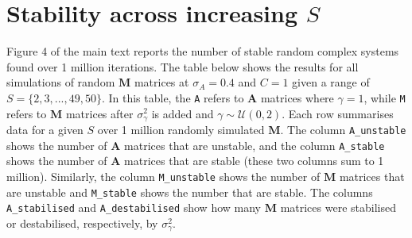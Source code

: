 \documentclass[]{article}
\begin{document}
\hypertarget{IncrS}{\section{\texorpdfstring{Stability across increasing
\(S\)}{Stability across increasing S}}\label{IncrS}}

Figure 4 of the main text reports the number of stable random complex
systems found over 1 million iterations. The table below shows the
results for all simulations of random \(\mathbf{M}\) matrices at
\(\sigma_{A} = 0.4\) and \(C = 1\) given a range of
\(S = \{2, 3, ..., 49, 50\}\). In this table, the \texttt{A} refers to
\(\mathbf{A}\) matrices where \(\gamma = 1\), while \texttt{M} refers to
\(\mathbf{M}\) matrices after \(\sigma^{2}_{\gamma}\) is added and
\(\gamma \sim \mathcal{U}(0, 2)\). Each row summarises data for a given
\(S\) over 1 million randomly simulated \(\mathbf{M}\). The column
\texttt{A\_unstable} shows the number of \(\mathbf{A}\) matrices that
are unstable, and the column \texttt{A\_stable} shows the number of
\(\mathbf{A}\) matrices that are stable (these two columns sum to 1
million). Similarly, the column \texttt{M\_unstable} shows the number of
\(\mathbf{M}\) matrices that are unstable and \texttt{M\_stable} shows
the number that are stable. The columns \texttt{A\_stabilised} and
\texttt{A\_destabilised} show how many \(\mathbf{M}\) matrices were
stabilised or destabilised, respectively, by \(\sigma^{2}_{\gamma}\).
\end{document}
